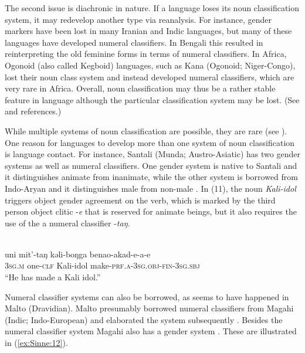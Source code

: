 \documentclass[output=collectionpaper]{langsci/langscibook}
\begin{document}
The second issue is diachronic in nature. If a language loses its noun classification system, it may redevelop another type via reanalysis. For instance, gender markers have been lost in many Iranian and Indic languages, but many of these languages have developed numeral classifiers. In Bengali this resulted in reinterpreting the old feminine forms in terms of numeral classifiers. In Africa, Ogonoid (also called Kegboid) languages, such as Kana (Ogonoid; Niger-Congo), lost their noun class system and instead developed numeral classifiers, which are very rare in Africa. Overall, noun classification may thus be a rather stable feature in language although the particular classification system may be lost. (See \citealt[379--381]{Aikhenvald2000} and references.)

While multiple systems of noun classification are possible, they are rare (see ). One reason for languages to develop more than one system of noun classification is language contact. For instance, Santali (Munda; Austro-Asiatic) has two gender systems as well as numeral classifiers. One gender system is native to Santali and it distinguishes animate from inanimate, while the other system is borrowed from Indo-Aryan and it distinguishes male from non-male \citep[39]{Ghosh2008}. In (11), the noun \textit{Kali-idol} triggers object gender agreement on the verb, which is marked by the third person object clitic -\textit{e} that is reserved for animate beings, but it also requires the use of the a numeral classifier -\textit{taŋ}.

\ea
\label{ex:Sinne:11}
\\
\gll uni mit'-taŋ kəli-boŋga benao-akad-e-a-e \\
\textsc{3sg.m} one-\textsc{clf} Kali-idol make-\textsc{prf.a-3sg.obj-fin-3sg.sbj}\\
\glt ``He has made a Kali idol.''\\
\z

Numeral classifier systems can also be borrowed, as seems to have happened in Malto (Dravidian). Malto presumably borrowed numeral classifiers from Magahi (Indic; Indo-European) and elaborated the system subsequently \citep[117--118]{Emeneau1980}. Besides the numeral classifier system Magahi also has a gender system \citep{Steever1998}. These are illustrated in (\ref{ex:Sinne:12}).

%
\end{document}

